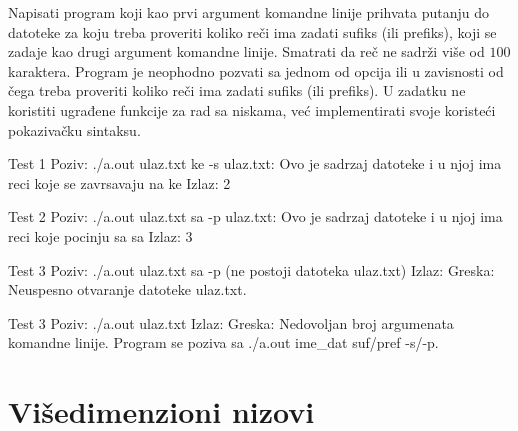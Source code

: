\begin{Exercise}[label=307]
Napisati program koji kao prvi argument komandne linije prihvata
putanju do datoteke za koju treba proveriti koliko reči ima
zadati sufiks (ili prefiks), koji se zadaje kao drugi argument
komandne linije. Smatrati da reč ne sadrži više od $100$ karaktera.
Program je neophodno pozvati sa jednom od opcija
 ili  u zavisnosti od čega treba proveriti
koliko reči ima zadati sufiks (ili prefiks). U zadatku ne
koristiti ugrađene funkcije za rad sa niskama, već
implementirati svoje koristeći pokazivačku sintaksu.

\begin{maxitest}
\begin{test}{Test 1}
Poziv:    ./a.out ulaz.txt ke -s
ulaz.txt: Ovo je sadrzaj datoteke i u njoj ima reci koje se 
          zavrsavaju na ke
Izlaz:    2
\end{test}
\end{maxitest}

\begin{maxitest}
\begin{test}{Test 2}
Poziv:    ./a.out ulaz.txt sa -p
ulaz.txt: Ovo je sadrzaj datoteke i u njoj ima reci koje 
          pocinju sa sa
Izlaz:    3
\end{test}
\end{maxitest}

\begin{maxitest}
\begin{test}{Test 3}
Poziv:  ./a.out ulaz.txt sa -p
(ne postoji datoteka ulaz.txt)
Izlaz:  Greska: Neuspesno otvaranje datoteke ulaz.txt.
\end{test}
\end{maxitest}

\begin{maxitest}
\begin{test}{Test 3}
Poziv:  ./a.out ulaz.txt
Izlaz:  Greska: Nedovoljan broj argumenata komandne linije.
        Program se poziva sa ./a.out ime_dat suf/pref -s/-p.
\end{test}
\end{maxitest}

\end{Exercise}
\begin{Answer}[ref=307]
\end{Answer}

\section{Višedimenzioni nizovi}

